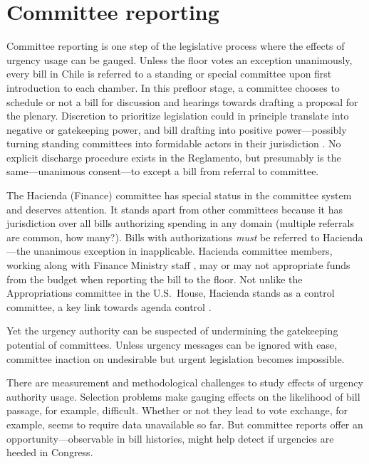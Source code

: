 \documentclass[letter,12pt]{article}
\begin{document}
 



\section{Committee reporting}

Committee reporting is one step of the legislative process where the effects of urgency usage can be gauged. Unless the floor votes an exception unanimously, every bill in Chile is referred to a standing or special committee upon first introduction to each chamber. In this prefloor stage, a committee chooses to schedule or not a bill for discussion and hearings towards drafting a proposal for the plenary. Discretion to prioritize legislation could in principle translate into negative or gatekeeping power, and bill drafting into positive power---possibly turning standing committees into formidable actors in their jurisdiction \citep{cox.mccubbins.1993,fenno.1973,shepsle.weingast.1987}. No explicit discharge procedure exists in the Reglamento, but presumably is the same---unanimous consent---to except a bill from referral to committee. 

The Hacienda (Finance) committee has special status in the committee system and deserves attention. It stands apart from other committees because it has jurisdiction over all bills authorizing spending in any domain (multiple referrals are common, how many?). Bills with authorizations \emph{must} be referred to Hacienda---the unanimous exception in inapplicable. Hacienda committee members, working along with Finance Ministry staff \citep{aleman.navia.UrgChi.2009}, may or may not appropriate funds from the budget when reporting the bill to the floor. Not unlike the Appropriations committee in the U.S.\ House, Hacienda stands as a control committee, a key link towards agenda control \citep{kiewiet.mccubbins.1991}. 

Yet the urgency authority can be suspected of undermining the gatekeeping potential of committees. Unless urgency messages can be ignored with ease, committee inaction on undesirable but urgent legislation becomes impossible. 

There are measurement and methodological challenges to study effects of urgency authority usage. Selection problems make gauging effects on the likelihood of bill passage, for example, difficult. Whether or not they lead to vote exchange, for example, seems to require data unavailable so far. But committee reports offer an opportunity---observable in bill histories, might help detect if urgencies are heeded in Congress. 
\end{document}
